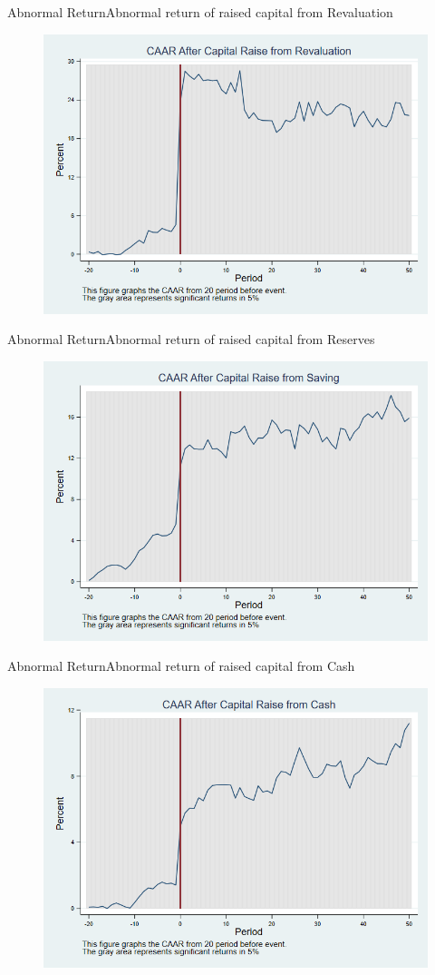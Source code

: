 \documentclass{beamer}
\begin{document}
\begin{frame}{Abnormal Return}{Abnormal return of raised capital from Revaluation}
	\label{car_withoutalphaRevaluation}
	\begin{figure}
		\centering
		\includegraphics[width=0.65\linewidth]{Output/car_withoutalphaRevaluation.png}
		\label{fig:car_withoutalphaRevaluation}
	\end{figure}
	

\end{frame}


\begin{frame}{Abnormal Return}{Abnormal return of raised capital from Reserves}
	\label{car_withoutalphaSaving}
	\begin{figure}
		\centering
		\includegraphics[width=0.65\linewidth]{Output/car_withoutalphaSaving.png}
		\label{fig:car_withoutalphaSaving}
	\end{figure}
\end{frame}


\begin{frame}{Abnormal Return}{Abnormal return of raised capital from Cash}
	\label{car_withoutalphacash}
	\begin{figure}
		\centering
		\includegraphics[width=0.65\linewidth]{Output/car_withoutalphaCash}
		\label{fig:car_withoutalphacash3}
	\end{figure}
	
\end{frame}
\end{document}
